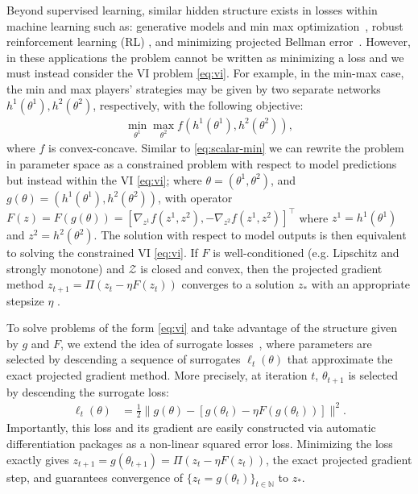 \documentclass{article} %
\theoremstyle{definition}
\newcommand{\nnumbers}{\mathbb{N}}
\newcommand{\inner}[2]{\langle #1, #2 \rangle}
\begin{document}
Beyond supervised learning, similar hidden structure exists in losses within machine learning such as: generative models and min max optimization~\citep{gidel2021limited}, robust reinforcement learning (RL) \citep{pinto2017robust}, and minimizing projected Bellman error~\citep{bertsekas2009projected}.
However, in these applications the problem cannot be written as minimizing a loss and we must instead consider the VI problem \eqref{eq:vi}.
For example, in the min-max case, the min and max players' strategies may be given by two separate networks $h^1(\theta^1), h^2(\theta^2)$, respectively,
with the following objective:
\begin{align}\label{eq:min-max}
    \min_{\theta^1} \max_{\theta^2}f(h^1(\theta^1), h^2(\theta^2)),
\end{align}
where $f$ is convex-concave. 
Similar to \eqref{eq:scalar-min} we can rewrite the problem in parameter space as a constrained problem with respect to model predictions but instead within the VI \eqref{eq:vi};
where $\theta = (\theta^1, \theta^2)$,  and $g(\theta) = (h^1(\theta^1), h^2(\theta^2))$, with operator $F(z) = F(g(\theta)) = [\nabla_{z^1} f(z^1, z^2), -\nabla_{z^2} f(z^1, z^2)]^\top$ where $z^1= h^1(\theta^1)$ and $z^2= h^2(\theta^2)$.
The solution with respect to model outputs is then equivalent to solving the constrained VI \eqref{eq:vi}.
If $F$ is well-conditioned (e.g. Lipschitz and strongly monotone) and $\mathcal{Z}$ is closed and convex, then the projected gradient method $z_{t+1}=\Pi(z_t -\eta F(z_t))$ converges to a solution $z_\ast$ with an appropriate stepsize $\eta$ \citep{facchinei2003finite}.

To solve problems of the form \eqref{eq:vi} and take advantage of the structure given by $g$ and $F$, we extend the idea of surrogate losses~\citep{pmlr-v119-johnson20b,vaswani2021general}, where parameters are selected by
descending a sequence of surrogates $\ell_t(\theta)$ that approximate the exact projected gradient method.
More precisely, at iteration $t$, $\theta_{t+1}$ is selected by descending the surrogate loss:
\begin{align}\label{eq:surr}
    \ell_t(\theta) &= \frac{1}{2}\big\|g(\theta) - [g(\theta_t) - \eta F(g(\theta_t))] \big\|^2.%
\end{align}
Importantly, this loss and its gradient are easily constructed via automatic differentiation packages as a non-linear squared error loss. 
Minimizing the loss exactly gives  $z_{t+1} = g(\theta_{t+1}) =  \Pi(z_t - \eta F(z_t))$, the exact projected gradient step, and guarantees convergence of $\{z_t = g(\theta_t)\}_{t\in\nnumbers}$ to $z_\ast$.
\end{document}
